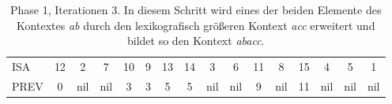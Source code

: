 \begin{table}[H]
\begin{adjustbox}{max width=\textwidth}
\begin{tabular}{lccccccccccccccc}
\multicolumn{1}{l|}{ISA}     & 12                      & 2   & \cellcolor[HTML]{\red}7 & 10 & 9                         & 13                                              & 14                                                 & 3                       & \cellcolor[HTML]{\red}6 & 11 & 8                       & 15  & 4   & 5   & 1   \\
\multicolumn{1}{l|}{PREV}    & 0                       & nil & nil                       & 3  & \cellcolor[HTML]{\red}3 & 5                                               & 5                                                  & nil                     & nil                       & 9  & nil                     & 11  & nil & nil & nil
\end{tabular}
\end{adjustbox}

\caption[Phase 1, Iterationen 3]{Phase 1, Iterationen 3. In diesem Schritt wird eines der beiden Elemente des Kontextes \textit{ab} durch den lexikografisch größeren Kontext \textit{acc} erweitert und bildet so den Kontext \textit{abacc}.}
\label{table_complex_example_1_3} 
\end{table}

